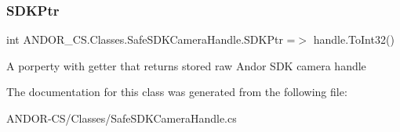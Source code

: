 \subsubsection{\texorpdfstring{S\+D\+K\+Ptr}{SDKPtr}}
{\footnotesize\ttfamily int A\+N\+D\+O\+R\+\_\+\+C\+S.\+Classes.\+Safe\+S\+D\+K\+Camera\+Handle.\+S\+D\+K\+Ptr =$>$ handle.\+To\+Int32()}



A porperty with getter that returns stored raw Andor S\+DK camera handle 



The documentation for this class was generated from the following file\+:\begin{DoxyCompactItemize}
\item 
A\+N\+D\+O\+R-\/\+C\+S/\+Classes/Safe\+S\+D\+K\+Camera\+Handle.\+cs\end{DoxyCompactItemize}
